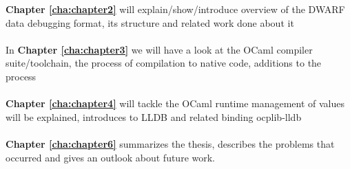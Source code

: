 \textbf{Chapter \ref{cha:chapter2}} will explain/show/introduce overview of the DWARF data debugging format, its structure and related work done about it
\\
\\
In \textbf{Chapter \ref{cha:chapter3}} we will have a look at the OCaml compiler suite/toolchain, the process of compilation to native code, additions to the process
\\
\\
\textbf{Chapter \ref{cha:chapter4}} will tackle the OCaml runtime management of values will be explained, introduces to LLDB and related binding ocplib-lldb
\\
\\
\textbf{Chapter \ref{cha:chapter6}} summarizes the thesis, describes the problems that occurred and gives an outlook about future work.


